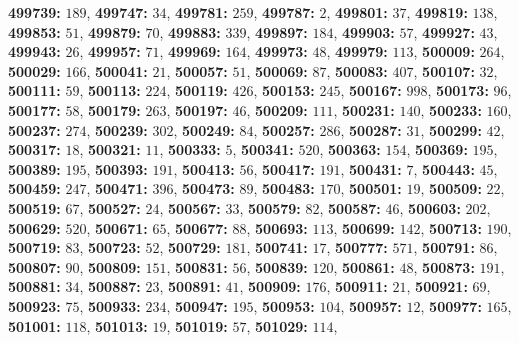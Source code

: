 \textsf{\bfseries 499739:} $189$, \textsf{\bfseries 499747:} $34$, \textsf{\bfseries 499781:} $259$, \textsf{\bfseries 499787:} $2$, \textsf{\bfseries 499801:} $37$, \textsf{\bfseries 499819:} $138$, \textsf{\bfseries 499853:} $51$, \textsf{\bfseries 499879:} $70$, \textsf{\bfseries 499883:} $339$, \textsf{\bfseries 499897:} $184$, \textsf{\bfseries 499903:} $57$, \textsf{\bfseries 499927:} $43$, \textsf{\bfseries 499943:} $26$, \textsf{\bfseries 499957:} $71$, \textsf{\bfseries 499969:} $164$, \textsf{\bfseries 499973:} $48$, \textsf{\bfseries 499979:} $113$, \textsf{\bfseries 500009:} $264$, \textsf{\bfseries 500029:} $166$, \textsf{\bfseries 500041:} $21$, \textsf{\bfseries 500057:} $51$, \textsf{\bfseries 500069:} $87$, \textsf{\bfseries 500083:} $407$, \textsf{\bfseries 500107:} $32$, \textsf{\bfseries 500111:} $59$, \textsf{\bfseries 500113:} $224$, \textsf{\bfseries 500119:} $426$, \textsf{\bfseries 500153:} $245$, \textsf{\bfseries 500167:} $998$, \textsf{\bfseries 500173:} $96$, \textsf{\bfseries 500177:} $58$, \textsf{\bfseries 500179:} $263$, \textsf{\bfseries 500197:} $46$, \textsf{\bfseries 500209:} $111$, \textsf{\bfseries 500231:} $140$, \textsf{\bfseries 500233:} $160$, \textsf{\bfseries 500237:} $274$, \textsf{\bfseries 500239:} $302$, \textsf{\bfseries 500249:} $84$, \textsf{\bfseries 500257:} $286$, \textsf{\bfseries 500287:} $31$, \textsf{\bfseries 500299:} $42$, \textsf{\bfseries 500317:} $18$, \textsf{\bfseries 500321:} $11$, \textsf{\bfseries 500333:} $5$, \textsf{\bfseries 500341:} $520$, \textsf{\bfseries 500363:} $154$, \textsf{\bfseries 500369:} $195$, \textsf{\bfseries 500389:} $195$, \textsf{\bfseries 500393:} $191$, \textsf{\bfseries 500413:} $56$, \textsf{\bfseries 500417:} $191$, \textsf{\bfseries 500431:} $7$, \textsf{\bfseries 500443:} $45$, \textsf{\bfseries 500459:} $247$, \textsf{\bfseries 500471:} $396$, \textsf{\bfseries 500473:} $89$, \textsf{\bfseries 500483:} $170$, \textsf{\bfseries 500501:} $19$, \textsf{\bfseries 500509:} $22$, \textsf{\bfseries 500519:} $67$, \textsf{\bfseries 500527:} $24$, \textsf{\bfseries 500567:} $33$, \textsf{\bfseries 500579:} $82$, \textsf{\bfseries 500587:} $46$, \textsf{\bfseries 500603:} $202$, \textsf{\bfseries 500629:} $520$, \textsf{\bfseries 500671:} $65$, \textsf{\bfseries 500677:} $88$, \textsf{\bfseries 500693:} $113$, \textsf{\bfseries 500699:} $142$, \textsf{\bfseries 500713:} $190$, \textsf{\bfseries 500719:} $83$, \textsf{\bfseries 500723:} $52$, \textsf{\bfseries 500729:} $181$, \textsf{\bfseries 500741:} $17$, \textsf{\bfseries 500777:} $571$, \textsf{\bfseries 500791:} $86$, \textsf{\bfseries 500807:} $90$, \textsf{\bfseries 500809:} $151$, \textsf{\bfseries 500831:} $56$, \textsf{\bfseries 500839:} $120$, \textsf{\bfseries 500861:} $48$, \textsf{\bfseries 500873:} $191$, \textsf{\bfseries 500881:} $34$, \textsf{\bfseries 500887:} $23$, \textsf{\bfseries 500891:} $41$, \textsf{\bfseries 500909:} $176$, \textsf{\bfseries 500911:} $21$, \textsf{\bfseries 500921:} $69$, \textsf{\bfseries 500923:} $75$, \textsf{\bfseries 500933:} $234$, \textsf{\bfseries 500947:} $195$, \textsf{\bfseries 500953:} $104$, \textsf{\bfseries 500957:} $12$, \textsf{\bfseries 500977:} $165$, \textsf{\bfseries 501001:} $118$, \textsf{\bfseries 501013:} $19$, \textsf{\bfseries 501019:} $57$, \textsf{\bfseries 501029:} $114$, 

